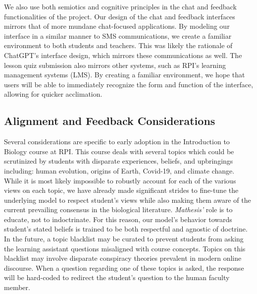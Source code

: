 \documentclass[12pt,a4paper]{article}
\begin{document}
    We also use both semiotics and cognitive principles in the chat and feedback functionalities of
    the project.  Our design of the chat and feedback interfaces mirrors that of more mundane chat-focused
    applications.  By modeling our interface in a similar manner to SMS communications, we create a
    familiar environment to both students and teachers.  This was likely the rationale of ChatGPT's
    interface design, which mirrors these communications as well.  The lesson quiz submission also
    mirrors other systems, such as RPI's learning management systems (LMS).  By creating a familiar
    environment, we hope that users will be able to immediately recognize the form and function of
    the interface, allowing for quicker acclimation.

    \subsection{Alignment and Feedback Considerations}

    Several considerations are specific to early adoption in the Introduction to Biology course at RPI.
    This course deals with several topics which could be scrutinized by students with disparate
    experiences, beliefs, and upbringings including: human evolution, origins of Earth, Covid-19,
    and climate change. While it is most likely impossible to robustly account for each of the various
    views on each topic, we have already made significant strides to fine-tune the underlying model
    to respect student’s views while also making them aware of the current prevailing consensus in
    the biological literature. \textit{Mathesis'} role is to educate, not to indoctrinate. For this reason,
    our model's behavior towards student's stated beliefs is trained to be both respectful and
    agnostic of doctrine. In the future, a topic blacklist may be curated to prevent students from
    asking the learning assistant questions misaligned with course concepts. Topics on this blacklist
    may involve disparate conspiracy theories prevalent in modern online discourse. When a question
    regarding one of these topics is asked, the response will be hard-coded to redirect the student's
    question to the human faculty member.
\end{document}
